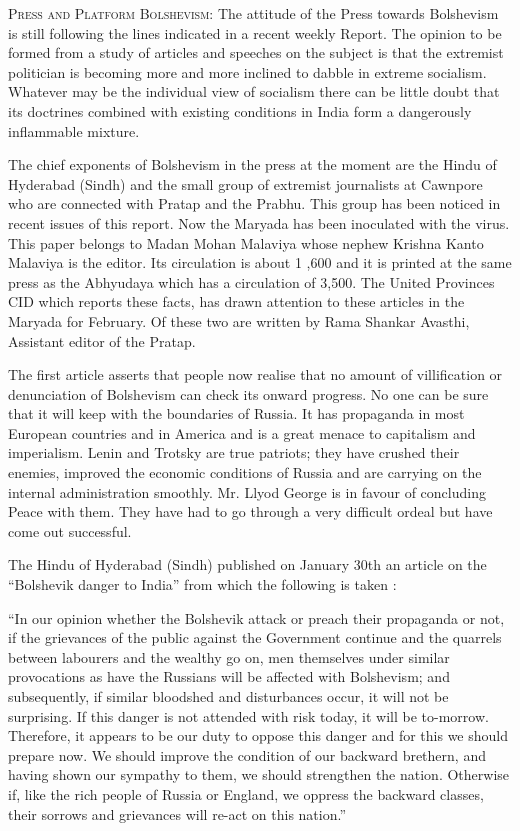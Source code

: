 \textsc{Press and Platform Bolshevism:} The attitude of the Press towards Bolshevism is still following the lines indicated in a recent weekly Report. The opinion to be formed from a study of articles and speeches on the subject is that the extremist politician is becoming more and more inclined to dabble in extreme socialism. Whatever may be the individual view of socialism there can be little doubt that its doctrines combined with existing conditions in India form a dangerously inflammable mixture. 
 
The chief exponents of Bolshevism in the press at the moment are the Hindu of Hyderabad (Sindh) and the small group of extremist journalists at Cawnpore who are connected with Pratap and the Prabhu. This group has been noticed in recent issues of this report. Now the Maryada has been inoculated with the virus. This paper belongs to Madan Mohan Malaviya whose nephew Krishna Kanto Malaviya is the editor. Its circulation is about 1 ,600 and it is printed at 
the same press as the Abhyudaya which has a circulation of 3,500. The United Provinces CID which reports these facts, has drawn attention to these articles in the Maryada for February. Of these two are written by Rama Shankar Avasthi, Assistant editor of the Pratap. 

The first article asserts that people now realise that no amount of villification or denunciation of Bolshevism can check its onward progress. No one can be sure that it will keep with the boundaries of Russia. It has propaganda in most European countries and in America and is a great menace to capitalism and imperialism. Lenin and Trotsky are true patriots; they have crushed their enemies, improved the economic conditions of Russia and are carrying on the
internal administration smoothly. Mr. Llyod George is in favour of concluding Peace with them. They have had to go through a very difficult ordeal but have come out successful. 

The Hindu of Hyderabad (Sindh) published on January 30th an article on the “Bolshevik danger to India” from which the following is taken : 

“In our opinion whether the Bolshevik attack or preach their propaganda or not, if the grievances of the public against the Government continue and the quarrels between labourers and the wealthy go on, men themselves under similar provocations as have the Russians will be affected with Bolshevism; and subsequently, if similar bloodshed and disturbances occur, it will not be surprising. If this danger is not attended with risk today, it will be to-morrow. Therefore, it appears to be our duty to oppose this danger and for this we should prepare now. We should improve the condition of our backward brethern, and having shown our sympathy to them, we should strengthen the nation. Otherwise if, like the rich people of Russia or England, we oppress the backward classes, their sorrows and grievances will re-act on this 
nation.” 

